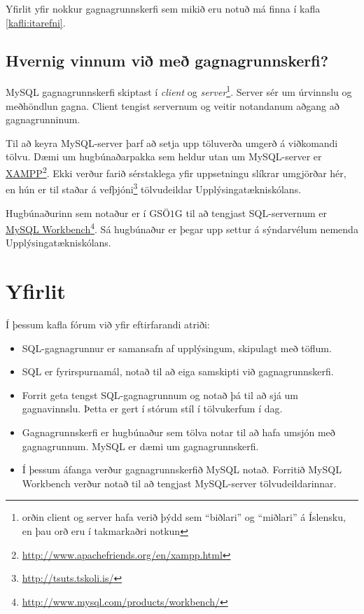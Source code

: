 Yfirlit yfir nokkur gagnagrunnskerfi sem mikið eru notuð má finna í kafla \ref{kafli:itarefni}.
\subsection{Hvernig vinnum við með gagnagrunnskerfi?}
MySQL gagnagrunnskerfi skiptast í \emph{client} og \emph{server}\footnote{orðin client og server hafa verið þýdd sem ``biðlari'' og ``miðlari'' á Íslensku, en þau orð eru í takmarkaðri notkun}. Server sér um úrvinnslu og meðhöndlun gagna. Client tengist servernum og veitir notandanum aðgang að gagnagrunninum.

Til að keyra MySQL-server þarf að setja upp töluverða umgerð á viðkomandi tölvu. Dæmi um hugbúnaðarpakka sem heldur utan um MySQL-server er \href{http://www.apachefriends.org/en/xampp.html}{XAMPP}\footnote{\url{http://www.apachefriends.org/en/xampp.html}}. Ekki verður farið sérstaklega yfir uppsetningu slíkrar umgjörðar hér, en hún er til staðar á vefþjóni\footnote{\url{http://tsuts.tskoli.is/}} tölvudeildar Upplýsingatækniskólans.

Hugbúnaðurinn sem notaður er í GSÖ$1$G til að tengjast SQL-servernum er \href{http://www.mysql.com/products/workbench/}{MySQL Workbench}\footnote{\url{http://www.mysql.com/products/workbench/}}. Sá hugbúnaður er þegar upp settur á sýndarvélum nemenda Upplýsingatækniskólans.
\section{Yfirlit}
Í þessum kafla fórum við yfir eftirfarandi atriði:
\begin{itemize}
 \item SQL-gagnagrunnur er samansafn af upplýsingum, skipulagt með töflum.
 \item SQL er fyrirspurnamál, notað til að eiga samskipti við gagnagrunnskerfi.
 \item Forrit geta tengst SQL-gagnagrunnum og notað þá til að sjá um gagnavinnslu. Þetta er gert í stórum stíl í tölvukerfum í dag.
 \item Gagnagrunnskerfi er hugbúnaður sem tölva notar til að hafa umsjón með gagnagrunnum. MySQL er dæmi um gagnagrunnskerfi.
 \item Í þessum áfanga verður gagnagrunnskerfið MySQL notað. Forritið MySQL Workbench verður notað til að tengjast MySQL-server tölvudeildarinnar.
\end{itemize}